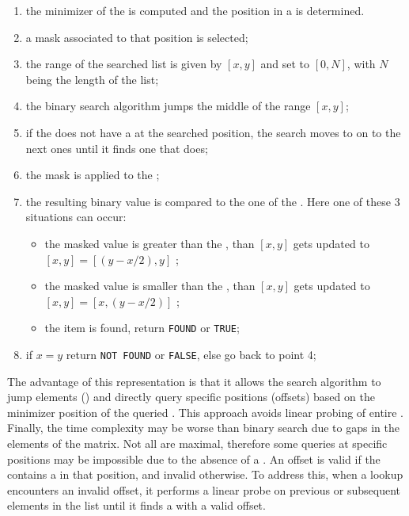 \begin{enumerate}
	\item the minimizer of the \kmers is computed and the \kmer position in a \skmer is determined.
	\item a mask associated to that position is selected;
	\item the range of the searched list is given by $[x,y]$ and set to $[0,N]$, with $N$ being the length of the list;
	\item the binary search algorithm jumps the middle \skmer of the range $[x,y]$;
	\item if the \skmer does not have a \kmer at the searched position, the search moves to on to the next ones until it finds one that does;
	\item the mask is applied to the \skmer;
	\item the resulting binary value is compared to the one of the \kmer. Here one of these 3 situations can occur:
	\begin{itemize}
		\item the masked \skmer value is greater than the \kmer, than $[x,y]$ gets updated to $[x,y] = [(y-x/2),y]$ ;
		\item the masked \skmer value is smaller than the \kmer, than $[x,y]$ gets updated to $[x,y] = [x,(y-x/2)]$ ;
		\item the item is found, return \texttt{FOUND} or \texttt{TRUE};
	\end{itemize}
	\item if $x = y$ return \texttt{NOT FOUND} or \texttt{FALSE}, else go back to point 4;
\end{enumerate}
The advantage of this \skmer representation is that it allows the search algorithm to jump elements (\skmers) and directly query specific positions (offsets) based on the minimizer position of the queried \kmer. This approach avoids linear probing of entire \skmers.\\
Finally, the time complexity may be worse than binary search due to gaps in the elements of the matrix. Not all \skmers are maximal, therefore some queries at specific positions may be impossible due to the absence of a \kmer. An offset is valid if the \skmer contains a \kmer in that position, and invalid otherwise. To address this, when a lookup encounters an invalid offset, it performs a linear probe on previous or subsequent elements in the list until it finds a \skmer with a valid offset.


